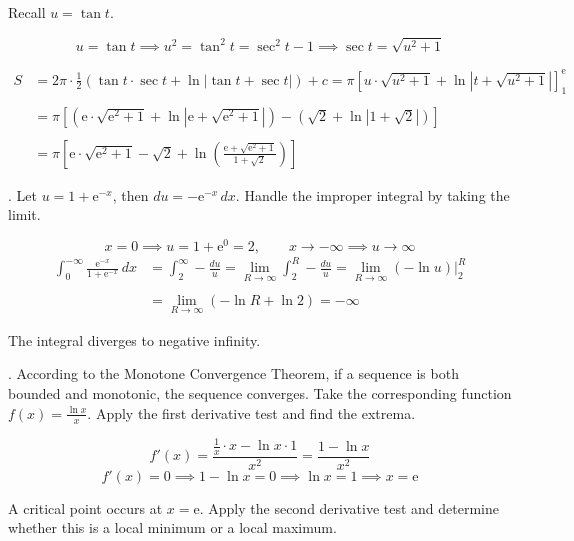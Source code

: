 \documentclass{article}
\begin{document}
\hfill

\noindent Recall $u=\tan t$.

\[u=\tan t\implies u^2=\tan^2t=\sec^2t-1\implies \sec t=\sqrt{u^2+1}\]

\newpage

\begin{align*}S&=2\pi\cdot\frac12\left(\tan t\cdot\sec t+\ln\left|\tan t+\sec t\right|\right)+c=\pi\left[u\cdot\sqrt{u^2+1}+\ln\left|t+\sqrt{u^2+1}\right|\right]_1^{\mathrm{e}}\\\\&=\pi\left[\left(\mathrm{e}\cdot\sqrt{\mathrm{e}^2+1}+\ln\left|\mathrm{e}+\sqrt{\mathrm{e}^2+1}\right|\right)-\left(\sqrt2+\ln\left|1+\sqrt2\right|\right)\right]\\\\&=\boxed{\pi\left[\mathrm{e}\cdot\sqrt{\mathrm{e}^2+1}-\sqrt2+\ln\left(\frac{\mathrm{e}+\sqrt{\mathrm{e}^2+1}}{1+\sqrt2}\right)\right]}\end{align*}

\hfill

. Let $u=1+\mathrm{e}^{-x}$, then $du=-\mathrm{e}^{-x}\,dx$. Handle the improper integral by taking the limit.

\[x=0\implies u=1+\mathrm{e}^0=2,\qquad x\to-\infty\implies u\to\infty\]
\begin{align*}\int_0^{-\infty}\frac{\mathrm{e}^{-x}}{1+\mathrm{e}^{-x}}\,dx&=\int_2^{\infty}-\frac{du}{u}=\lim_{R\to\infty}\int_2^R-\frac{du}{u}=\lim_{R\to\infty}\left(-\ln u\right)\bigg|_2^R\\\\&=\lim_{R\to\infty}\left(-\ln R+\ln2\right)=\boxed{-\infty}\end{align*}

\hfill

\noindent The integral diverges to negative infinity.

\hfill

. According to the Monotone Convergence Theorem, if a sequence is both bounded and monotonic, the sequence converges. Take the corresponding function $\displaystyle f(x)=\frac{\ln x}x$. Apply the first derivative test and find the extrema.

\[f'(x)=\frac{\frac1x\cdot x-\ln x\cdot1}{x^2}=\frac{1-\ln x}{x^2}\]
\[f'(x)=0\implies 1-\ln x=0\implies \ln x=1\implies x=\mathrm{e}\]

\hfill

\noindent A critical point occurs at $x=\mathrm{e}$. Apply the second derivative test and determine whether this is a local minimum or a local maximum.
\end{document}
